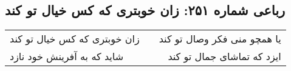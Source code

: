 \begin{center}
\section*{رباعی شماره ۲۵۱: زان خوبتری که کس خیال تو کند}
\label{sec:sh251}
\begin{longtable}{l p{0.5cm} r}
زان خوبتری که کس خیال تو کند
&&
یا همچو منی فکر وصال تو کند
\\
شاید که به آفرینش خود نازد
&&
ایزد که تماشای جمال تو کند
\\
\end{longtable}
\end{center}
